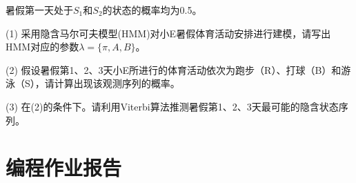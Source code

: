 \documentclass[a4paper]{article}
\begin{document}
\hspace{2em}暑假第一天处于$S_1$和$S_2$的状态的概率均为0.5。

\vspace{3mm}
(1) 采用隐含马尔可夫模型(HMM)对小E暑假体育活动安排进行建模，{\color{blue}请写出HMM对应的参数$\lambda=\{\pi, A, B\}$}。

\vspace{3mm}
(2) 假设暑假第1、2、3天小E所进行的体育活动依次为跑步（R）、打球（B）和游泳（S），{\color{blue}请计算出现该观测序列的概率}。

\vspace{3mm}
(3) 在(2)的条件下。{\color{blue}请利用Viterbi算法推测暑假第1、2、3天最可能的隐含状态序列}。


\section{编程作业报告}
\end{document}
